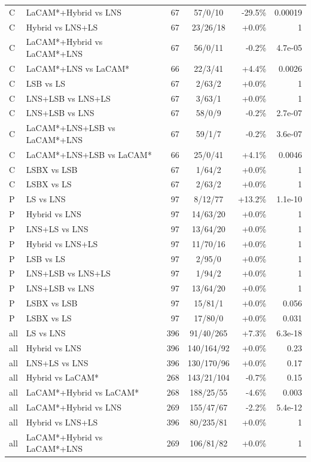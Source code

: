 \begin{table}[t]
\begin{tabular}{llrcrr}
C & LaCAM*+Hybrid vs LNS & 67 & 57/0/10 & -29.5\% & 0.00019\\
C & Hybrid vs LNS+LS & 67 & 23/26/18 & +0.0\% & 1\\
C & LaCAM*+Hybrid vs LaCAM*+LNS & 67 & 56/0/11 & -0.2\% & 4.7e-05\\
C & LaCAM*+LNS vs LaCAM* & 66 & 22/3/41 & +4.4\% & 0.0026\\
C & LSB vs LS & 67 & 2/63/2 & +0.0\% & 1\\
C & LNS+LSB vs LNS+LS & 67 & 3/63/1 & +0.0\% & 1\\
C & LNS+LSB vs LNS & 67 & 58/0/9 & -0.2\% & 2.7e-07\\
C & LaCAM*+LNS+LSB vs LaCAM*+LNS & 67 & 59/1/7 & -0.2\% & 3.6e-07\\
C & LaCAM*+LNS+LSB vs LaCAM* & 66 & 25/0/41 & +4.1\% & 0.0046\\
C & LSBX vs LSB & 67 & 1/64/2 & +0.0\% & 1\\
C & LSBX vs LS & 67 & 2/63/2 & +0.0\% & 1\\
P & LS vs LNS & 97 & 8/12/77 & +13.2\% & 1.1e-10\\
P & Hybrid vs LNS & 97 & 14/63/20 & +0.0\% & 1\\
P & LNS+LS vs LNS & 97 & 13/64/20 & +0.0\% & 1\\
P & Hybrid vs LNS+LS & 97 & 11/70/16 & +0.0\% & 1\\
P & LSB vs LS & 97 & 2/95/0 & +0.0\% & 1\\
P & LNS+LSB vs LNS+LS & 97 & 1/94/2 & +0.0\% & 1\\
P & LNS+LSB vs LNS & 97 & 13/64/20 & +0.0\% & 1\\
P & LSBX vs LSB & 97 & 15/81/1 & +0.0\% & 0.056\\
P & LSBX vs LS & 97 & 17/80/0 & +0.0\% & 0.031\\
all & LS vs LNS & 396 & 91/40/265 & +7.3\% & 6.3e-18\\
all & Hybrid vs LNS & 396 & 140/164/92 & +0.0\% & 0.23\\
all & LNS+LS vs LNS & 396 & 130/170/96 & +0.0\% & 0.17\\
all & Hybrid vs LaCAM* & 268 & 143/21/104 & -0.7\% & 0.15\\
all & LaCAM*+Hybrid vs LaCAM* & 268 & 188/25/55 & -4.6\% & 0.003\\
all & LaCAM*+Hybrid vs LNS & 269 & 155/47/67 & -2.2\% & 5.4e-12\\
all & Hybrid vs LNS+LS & 396 & 80/235/81 & +0.0\% & 1\\
all & LaCAM*+Hybrid vs LaCAM*+LNS & 269 & 106/81/82 & +0.0\% & 1\\

\end{tabular}
\end{table}

